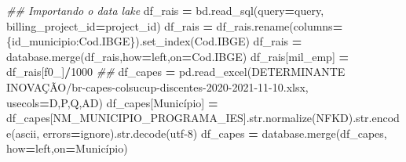\documentclass[
  12,
  dvipsnames]{article}
\newenvironment{Shaded}{\begin{snugshade}}{\end{snugshade}}
\newcommand{\BuiltInTok}[1]{#1}
\newcommand{\CommentTok}[1]{\textcolor[rgb]{0.56,0.35,0.01}{\textit{#1}}}
\newcommand{\DecValTok}[1]{\textcolor[rgb]{0.00,0.00,0.81}{#1}}
\newcommand{\NormalTok}[1]{#1}
\newcommand{\OperatorTok}[1]{\textcolor[rgb]{0.81,0.36,0.00}{\textbf{#1}}}
\newcommand{\StringTok}[1]{\textcolor[rgb]{0.31,0.60,0.02}{#1}}
\begin{document}
\begin{Shaded}
\begin{Highlighting}[]
\CommentTok{\#\# Importando o data lake}
\NormalTok{df\_rais }\OperatorTok{=}\NormalTok{ bd.read\_sql(query}\OperatorTok{=}\NormalTok{query, billing\_project\_id}\OperatorTok{=}\NormalTok{project\_id)}
\NormalTok{df\_rais }\OperatorTok{=}\NormalTok{ df\_rais.rename(columns}\OperatorTok{=}\NormalTok{\{}\StringTok{\textquotesingle{}id\_municipio\textquotesingle{}}\NormalTok{:}\StringTok{\textquotesingle{}Cod.IBGE\textquotesingle{}}\NormalTok{\}).set\_index(}\StringTok{\textquotesingle{}Cod.IBGE\textquotesingle{}}\NormalTok{)}
\NormalTok{df\_rais }\OperatorTok{=}\NormalTok{ database.merge(df\_rais,how}\OperatorTok{=}\StringTok{\textquotesingle{}left\textquotesingle{}}\NormalTok{,on}\OperatorTok{=}\StringTok{\textquotesingle{}Cod.IBGE\textquotesingle{}}\NormalTok{)}
\NormalTok{df\_rais[}\StringTok{\textquotesingle{}mil\_emp\textquotesingle{}}\NormalTok{] }\OperatorTok{=}\NormalTok{ df\_rais[}\StringTok{\textquotesingle{}f0\_\textquotesingle{}}\NormalTok{]}\OperatorTok{/}\DecValTok{1000}
\CommentTok{\#\# }
\NormalTok{df\_capes }\OperatorTok{=}\NormalTok{ pd.read\_excel(}\StringTok{\textquotesingle{}DETERMINANTE INOVAÇÃO/br{-}capes{-}colsucup{-}discentes{-}2020{-}2021{-}11{-}10.xlsx\textquotesingle{}}\NormalTok{, usecols}\OperatorTok{=}\StringTok{\textquotesingle{}D,P,Q,AD\textquotesingle{}}\NormalTok{)}
\NormalTok{df\_capes[}\StringTok{\textquotesingle{}Município\textquotesingle{}}\NormalTok{] }\OperatorTok{=}\NormalTok{ df\_capes[}\StringTok{\textquotesingle{}NM\_MUNICIPIO\_PROGRAMA\_IES\textquotesingle{}}\NormalTok{].}\BuiltInTok{str}\NormalTok{.normalize(}\StringTok{\textquotesingle{}NFKD\textquotesingle{}}\NormalTok{).}\BuiltInTok{str}\NormalTok{.encode(}\StringTok{\textquotesingle{}ascii\textquotesingle{}}\NormalTok{, errors}\OperatorTok{=}\StringTok{\textquotesingle{}ignore\textquotesingle{}}\NormalTok{).}\BuiltInTok{str}\NormalTok{.decode(}\StringTok{\textquotesingle{}utf{-}8\textquotesingle{}}\NormalTok{)}
\NormalTok{df\_capes }\OperatorTok{=}\NormalTok{ database.merge(df\_capes, how}\OperatorTok{=}\StringTok{\textquotesingle{}left\textquotesingle{}}\NormalTok{,on}\OperatorTok{=}\StringTok{\textquotesingle{}Município\textquotesingle{}}\NormalTok{)}


\end{Highlighting}
\end{Shaded}
\end{document}
